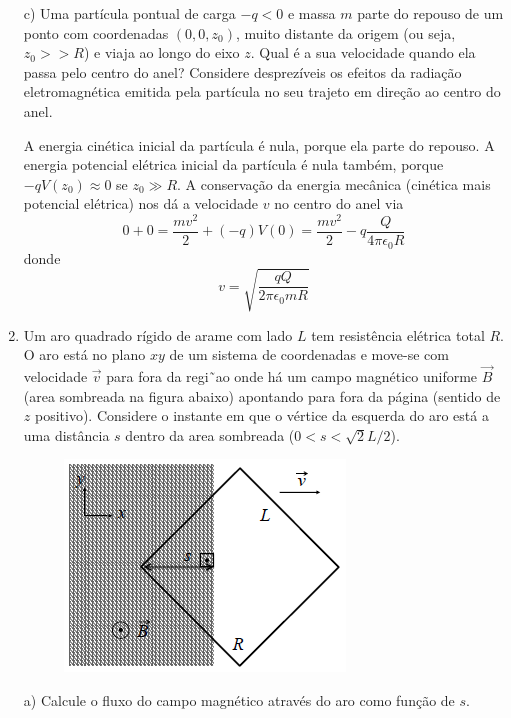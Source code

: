 \begin{enumerate}[start=1,label={\bfseries Q\arabic*.}]
c) Uma partícula pontual de carga $- q < 0$ e massa $m$ parte do repouso de um ponto com coordenadas $(0,0,z_{0})$, muito distante da origem (ou seja, $z_{0} >> R$) e viaja ao longo do eixo $z$. Qual é a sua velocidade quando ela passa pelo centro do anel? Considere desprezíveis os efeitos da radiação eletromagnética emitida pela partícula no seu trajeto em direção ao centro do anel.

\resposta A energia cinética inicial da partícula é nula, porque ela parte do repouso. A energia potencial elétrica inicial da partícula é nula também, porque $-q V\left(z_{0}\right) \approx 0$ se $z_{0} \gg R$. A conservação da energia mecânica (cinética mais potencial elétrica) nos dá a velocidade $v$ no centro do anel via
$$
0+0=\frac{m v^{2}}{2}+(-q) V(0)=\frac{m v^{2}}{2}-q \frac{Q}{4 \pi \epsilon_{0} R}
$$
donde
$$
v=\sqrt{\frac{q Q}{2 \pi \epsilon_{0} m R}}
$$





\item Um aro quadrado rígido de arame com lado $L$ tem resistência elétrica total $R$. O aro está no plano $xy$ de um sistema de coordenadas e move-se com velocidade $\vec{v}$ para fora da regi˜ao onde há um campo magnético uniforme $\vec{B}$ (area sombreada na figura abaixo) apontando para fora da página (sentido de $z$ positivo). Considere o instante em que o vértice da esquerda do aro está a uma distância $s$ dentro da area sombreada ($0 < s < \sqrt{2}L/2$).

\begin{figure}[H]
\centering
\includegraphics[scale=1]{eletromag-img/aro.png}
\end{figure}


a) Calcule o fluxo do campo magnético através do aro como função de $s$.


\end{enumerate}
